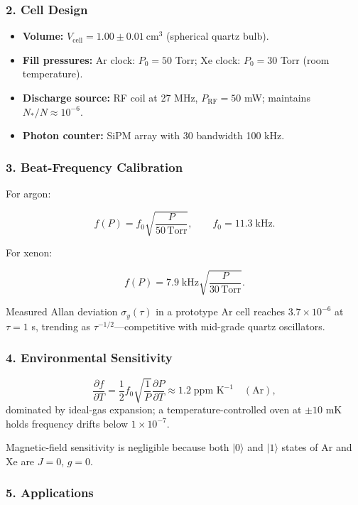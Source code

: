 \documentclass[11pt,oneside]{book}
\begin{document}
\subsubsection*{2. Cell Design}

\begin{itemize}
\item \textbf{Volume:} $V_{\text{cell}} = 1.00\pm0.01~\text{cm}^3$
      (spherical quartz bulb).  
\item \textbf{Fill pressures:}  
      Ar clock: $P_0 = 50$ Torr;  
      Xe clock: $P_0 = 30$ Torr (room temperature).  
\item \textbf{Discharge source:} RF coil at 27 MHz, $P_{\text{RF}} =
      50$ mW; maintains $N_\ast/N \approx 10^{-6}$.
\item \textbf{Photon counter:} SiPM array with 30 %
      bandwidth 100 kHz.
\end{itemize}

\subsubsection*{3. Beat-Frequency Calibration}

For argon:

\[
   f(P) = f_0 \sqrt{\frac{P}{50\,\text{Torr}}},\qquad
   f_0 = 11.3\;\text{kHz}.
\]

For xenon:

\[
   f(P) = 7.9\;\text{kHz} \sqrt{\frac{P}{30\,\text{Torr}}}.
\]

Measured Allan deviation $\sigma_y(\tau)$ in a prototype Ar cell reaches
$3.7\times10^{-6}$ at $\tau = 1$ s, trending as
$\tau^{-1/2}$—competitive with mid-grade quartz oscillators.

\subsubsection*{4. Environmental Sensitivity}

\[
   \frac{\partial f}{\partial T}
   =
   \frac{1}{2} f_0 \sqrt{\frac{1}{P}}
   \frac{\partial P}{\partial T}
   \approx
   1.2\;\text{ppm K}^{-1}\quad(\text{Ar}),
\]
dominated by ideal-gas expansion; a temperature-controlled oven at
$\pm10$ mK holds frequency drifts below $1\times10^{-7}$.

Magnetic-field sensitivity is negligible because both
$|0\rangle$ and $|1\rangle$ states of Ar and Xe are $J=0$, $g=0$.

\subsubsection*{5. Applications}
\end{document}
